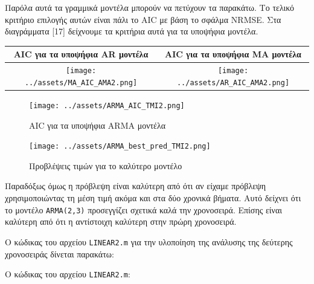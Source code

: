 \documentclass[11pt,]{article}
\begin{document}
Παρόλα αυτά τα γραμμικά μοντέλα μπορούν να πετύχουν τα παρακάτω. Το
τελικό κριτήριο επιλογής αυτών είναι πάλι το AIC με βάση το σφάλμα
NRMSE. Στα διαγράμματα {[}17{]} δείχνουμε τα κριτήρια αυτά για τα
υποψήφια μοντέλα.

\begin{longtable}[]{@{}cc@{}}
\toprule
AIC για τα υποψήφια AR μοντέλα & AIC για τα υποψήφια MA
μοντέλα\tabularnewline
\midrule
\endhead
\texttt{[image: ../assets/MA\_AIC\_AMA2.png]}
&
\texttt{[image: ../assets/AR\_AIC\_AMA2.png]}\tabularnewline
\bottomrule
\end{longtable}

\begin{figure}
\centering
\texttt{[image: ../assets/ARMA\_AIC\_TMI2.png]}
\caption{AIC για τα υποψήφια ARMA μοντέλα}
\end{figure}

\begin{figure}
\centering
\texttt{[image: ../assets/ARMA\_best\_pred\_TMI2.png]}
\caption{Προβλέψεις τιμών για το καλύτερο μοντέλο}
\end{figure}

Παραδόξως όμως η πρόβλεψη είναι καλύτερη από ότι αν είχαμε πρόβλεψη
χρησιμοποιώντας τη μέση τιμή ακόμα και στα δύο χρονικά βήματα. Αυτό
δείχνει ότι το μοντέλο \texttt{ARMA(2,3)} προσεγγίζει σχετικά καλά την
χρονοσειρά. Επίσης είναι καλύτερη από ότι η αντίστοιχη καλύτερη στην
πρώρη χρονοσειρά.

Ο κώδικας του αρχείου \texttt{LINEAR2.m} για την υλοποίηση της ανάλυσης
της δεύτερης χρονοσειράς δίνεται παρακάτω:

Ο κώδικας του αρχείου \texttt{LINEAR2.m}:
\end{document}

